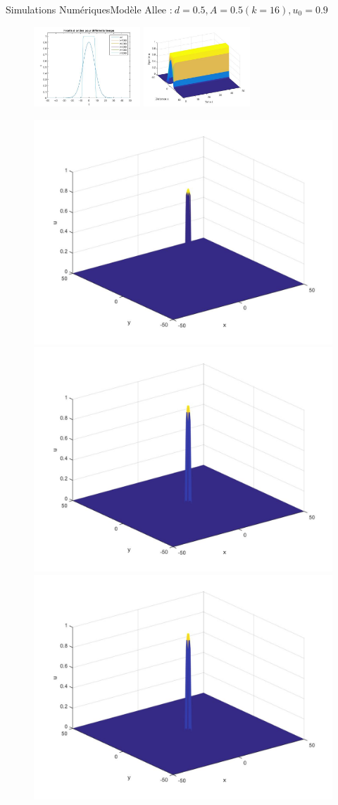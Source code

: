 \documentclass[10pt]{beamer}
\begin{document}
\begin{frame}{Simulations Numériques}{Modèle Allee :$\ d=0.5, A=0.5 (k=16), u_0=0.9$}
\begin{figure}[H]
	\centering
	\includegraphics[width=0.40\linewidth, height=3cm]{Allee/F2333}\hfill
	\includegraphics[width=0.55\linewidth, height=3cm]{Allee/F4333}
\end{figure}
\begin{figure}[H]
	\centering
	\includegraphics[width=0.3\linewidth]{Allee/333__1_}\hfill
    \includegraphics[width=0.3\linewidth]{Allee/333__2_}\hfill
	\includegraphics[width=0.3\linewidth]{Allee/333__3_}
\end{figure}
\end{frame}
\end{document}
